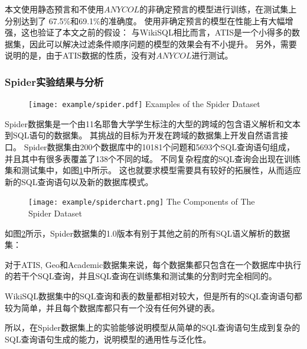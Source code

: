 本文使用静态预言和不使用$ANYCOL$的非确定预言的模型进行训练，在测试集上分别达到了 67.5\%和69.1\%的准确度。
使用非确定预言的模型在性能上有大幅增强，这也验证了本文之前的假设：
与WikiSQL相比而言，ATIS是一个小得多的数据集，因此可以解决过滤条件顺序问题的模型的效果会有不小提升。
另外，需要说明的是，由于ATIS数据的性质，没有对$ANYCOL$进行测试。

\subsubsection{Spider实验结果与分析}

\begin{figure}[!htp]
  \centering
  \texttt{[image: example/spider.pdf]}
    {Examples of the Spider Dataset}
  \label{fig:Spiderxample}
\end{figure}

Spider数据集是一个由11名耶鲁大学学生标注的大型的跨域的包含语义解析和文本到SQL语句的数据集。
其挑战的目标为开发在跨域的数据集上开发自然语言接口。
Spider数据集由200个数据库中的10181个问题和5693个SQL查询语句组成，并且其中有很多表覆盖了138个不同的域。
不同复杂程度的SQL查询会出现在训练集和测试集中，如图\ref{fig:Spiderxample}中所示。
这也就要求模型需要具有较好的拓展性，从而适应新的SQL查询语句以及新的数据库模式。

\begin{figure}[!htp]
  \centering
  \texttt{[image: example/spiderchart.png]}
    {The Components of The Spider Dataset}
  \label{fig:Spiderchart}
\end{figure}

如图\ref{fig:Spiderchart}所示，Spider数据集的1.0版本有别于其他之前的所有SQL语义解析的数据集：

\begin{itemize*}
  \item 对于ATIS, Geo和Academic数据集来说，每个数据集都只包含在一个数据库中执行的若干个SQL查询，并且SQL查询在训练集和测试集的分割时完全相同的。
  
  \item WikiSQL数据集中的SQL查询和表的数量都相对较大，但是所有的SQL查询语句都较为简单，并且每个数据库都只有一个没有任何外键的表。  
\end{itemize*}

所以，在Spider数据集上的实验能够说明模型从简单的SQL查询语句生成到复杂的SQL查询语句生成的能力，说明模型的通用性与泛化性。


